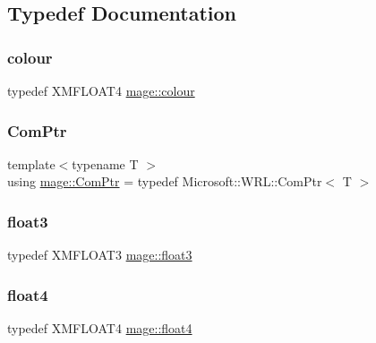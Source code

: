 \subsection{Typedef Documentation}
\hypertarget{namespacemage_a2d4dece8fe175b32167f9a7b925adc7c}{}\label{namespacemage_a2d4dece8fe175b32167f9a7b925adc7c} 
\subsubsection{\texorpdfstring{colour}{colour}}
{\footnotesize\ttfamily typedef X\+M\+F\+L\+O\+A\+T4 \hyperlink{namespacemage_a2d4dece8fe175b32167f9a7b925adc7c}{mage\+::colour}}

\hypertarget{namespacemage_ae74f374780900893caa5555d1031fd79}{}\label{namespacemage_ae74f374780900893caa5555d1031fd79} 
\subsubsection{\texorpdfstring{Com\+Ptr}{ComPtr}}
{\footnotesize\ttfamily template$<$typename T $>$ \\
using \hyperlink{namespacemage_ae74f374780900893caa5555d1031fd79}{mage\+::\+Com\+Ptr} = typedef Microsoft\+::\+W\+R\+L\+::\+Com\+Ptr$<$ T $>$}

\hypertarget{namespacemage_aab5dae4b0aaf8129b9e0d651d91d4b38}{}\label{namespacemage_aab5dae4b0aaf8129b9e0d651d91d4b38} 
\subsubsection{\texorpdfstring{float3}{float3}}
{\footnotesize\ttfamily typedef X\+M\+F\+L\+O\+A\+T3 \hyperlink{namespacemage_aab5dae4b0aaf8129b9e0d651d91d4b38}{mage\+::float3}}

\hypertarget{namespacemage_aa79484ea5211c29727b3794199ac0a55}{}\label{namespacemage_aa79484ea5211c29727b3794199ac0a55} 
\subsubsection{\texorpdfstring{float4}{float4}}
{\footnotesize\ttfamily typedef X\+M\+F\+L\+O\+A\+T4 \hyperlink{namespacemage_aa79484ea5211c29727b3794199ac0a55}{mage\+::float4}}

\hypertarget{namespacemage_a1e01ae66713838a7a67d30e44c67703e}{}\label{namespacemage_a1e01ae66713838a7a67d30e44c67703e} 
